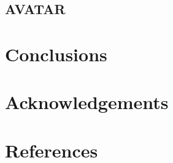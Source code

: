 \documentclass[review]{elsarticle}
\numberwithin{equation}{section}
\newcommand{\myreferences}{../references,../Mendeley_refs}
\numberwithin{equation}{section}
\begin{document}
\subsection{AVATAR}

\section{Conclusions}\label{sec:conclusions}

\section*{Acknowledgements}

\newpage

\section{References}


\newpage

\appendix

\end{document}
